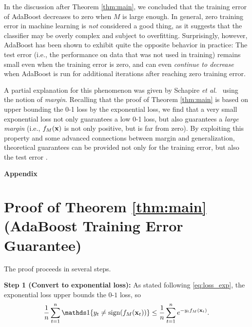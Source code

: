 \documentclass[english]{article}
\begin{document}
In the discussion after Theorem \ref{thm:main}, we concluded that the training error of AdaBoost decreases to zero when $M$ is large enough.  In general, zero training error in machine learning is {\em not} considered a good thing, as it suggests that the classifier may be overly complex and subject to overfitting.  Surprisingly, however, AdaBoost has been shown to exhibit quite the opposite behavior in practice:  The test error (i.e., the performance on data that was not used in training) remains small even when the training error is zero, and can even {\em continue to decrease} when AdaBoost is run for additional iterations after reaching zero training error.

A partial explanation for this phenomenon was given by Schapire {\em et al.}~\cite{schapire1998boosting} using the notion of {\em margin}.  Recalling that the proof of Theorem \ref{thm:main} is based on upper bounding the 0-1 loss by the exponential loss, we find that a very small exponential loss not only guarantees a low 0-1 loss, but also guarantees a {\em large margin} (i.e., $f_M(\mathbf{x})$ is not only positive, but is far from zero).  By exploiting this property and some advanced connections between margin and generalization, theoretical guarantees can be provided not only for the training error, but also the test error \cite{schapire1998boosting}.

 
\newpage



\newpage
{\huge \centering \bf Appendix \par}

\appendix

\section{Proof of Theorem \ref{thm:main} (AdaBoost Training Error Guarantee)}

The proof proceeds in several steps.

\medskip
{\noindent \bf Step 1 (Convert to exponential loss):} As stated following \eqref{eq:loss_exp}, the exponential loss upper bounds the $0$-$1$ loss, so
    \begin{equation}    
        \frac{1}{n}\sum_{t=1}^n\openone\{ y_t \ne \sign(f_M(\xv_t)) \} \le \frac{1}{n}\sum_{t=1}^n e^{-y_t f_M(\xv_t)}. \label{eq:step1a}
    \end{equation}
\end{document}
